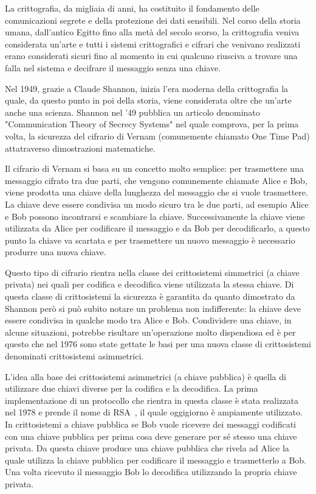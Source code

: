 La crittografia, da migliaia di anni, ha costituito il fondamento delle comunicazioni segrete e della protezione dei dati sensibili. 
Nel corso della storia umana, dall'antico Egitto fino alla met\`a del secolo scorso, la crittografia veniva considerata un'arte e tutti i sistemi crittografici e cifrari che venivano realizzati erano considerati sicuri fino al momento in cui qualcuno riusciva a trovare una falla nel sistema e decifrare il messaggio senza una chiave.

Nel 1949, grazie a Claude Shannon, inizia l'era moderna della crittografia la quale, da questo punto in poi della storia, viene considerata oltre che un'arte anche una scienza. Shannon nel '49 pubblica un articolo denominato "Communication Theory of Secrecy Systems"\cite{6769090} nel quale comprova, per la prima volta, la sicurezza del cifrario di Vernam (comunemente chiamato One Time Pad) attatraverso dimostrazioni matematiche.

Il cifrario di Vernam si basa su un concetto molto semplice: per trasmettere una messaggio cifrato tra due parti, che vengono comunemente chiamate Alice e Bob, viene prodotta una chiave della lunghezza del messaggio che si vuole trasmettere. La chiave deve essere condivisa un modo sicuro tra le due parti, ad esempio Alice e Bob possono incontrarsi e scambiare la chiave. Successivamente la chiave viene utilizzata da Alice per codificare il messaggio e da Bob per decodificarlo, a questo punto la chiave va scartata e per trasmettere un nuovo messaggio \`e necessario produrre una nuova chiave. 

Questo tipo di cifrario rientra nella classe dei crittosistemi simmetrici (a chiave privata) nei quali per codifica e decodifica viene utilizzata la stessa chiave. Di questa classe di crittosistemi la sicurezza \`e garantita da quanto dimostrato da Shannon per\`o si pu\`o subito notare un problema non indifferente: la chiave deve essere condivisa in qualche modo tra Alice e Bob. Condividere una chiave, in alcune situazioni, potrebbe risultare un'operazione molto dispendiosa ed \`e per questo che nel 1976 sono state gettate le basi per una nuova classe di crittosistemi denominati crittosistemi asimmetrici\cite{1055638}.

L'idea alla base dei crittosistemi asimmetrici (a chiave pubblica) \`e quella di utilizzare due chiavi diverse per la codifica e la decodifica. La prima implementazione di un protocollo che rientra in questa classe \`e stata realizzata nel 1978 e prende il nome di RSA~\cite{rivest1978method}, il quale oggigiorno \`e ampiamente utilizzato. In crittosistemi a chiave pubblica se Bob vuole ricevere dei messaggi codificati con una chiave pubblica per prima cosa deve generare per s\'e stesso una chiave privata. Da questa chiave produce una chiave pubblica che rivela ad Alice la quale utilizza la chiave pubblica per codificare il messaggio e trasmetterlo a Bob. Una volta ricevuto il messaggio Bob lo decodifica utilizzando la propria chiave privata.

